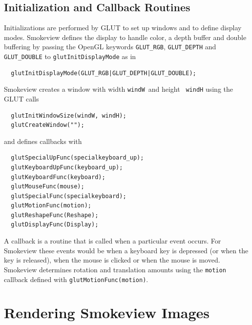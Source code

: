\documentclass[11pt,twoside]{book}
\begin{document}
%
%

\section{Initialization and Callback Routines}
Initializations are performed by GLUT to set up windows and to
define display modes.  Smokeview defines the display to handle
color, a depth buffer and double buffering by passing the OpenGL
keywords {\tt GLUT\_RGB}, {\tt GLUT\_DEPTH} and {\tt GLUT\_DOUBLE}
to {\tt glutInitDisplayMode} as in

\begin{verbatim}
  glutInitDisplayMode(GLUT_RGB|GLUT_DEPTH|GLUT_DOUBLE);
\end{verbatim}

Smokeview creates a window with width {\tt windW}\ and height {\tt
windH} using the GLUT calls

\begin{verbatim}
  glutInitWindowSize(windW, windH);
  glutCreateWindow("");
\end{verbatim}

and defines callbacks with

\begin{verbatim}
  glutSpecialUpFunc(specialkeyboard_up);
  glutKeyboardUpFunc(keyboard_up);
  glutKeyboardFunc(keyboard);
  glutMouseFunc(mouse);
  glutSpecialFunc(specialkeyboard);
  glutMotionFunc(motion);
  glutReshapeFunc(Reshape);
  glutDisplayFunc(Display);
\end{verbatim}

A callback is a routine that is called when a particular event
occurs.  For Smokeview these events would be when a keyboard key
is depressed (or when the key is released), when the mouse is
clicked or when the mouse is moved.  Smokeview determines rotation
and translation amounts using the {\tt motion} callback defined
with {\tt glutMotionFunc(motion)}.




%
%

\chapter{Rendering Smokeview Images}
\end{document}
